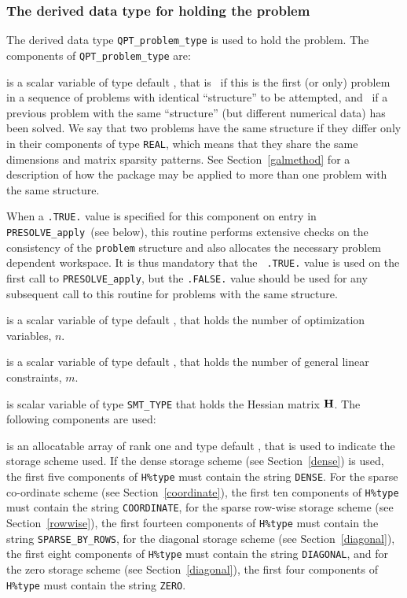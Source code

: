 \documentclass{galahad}
\newcommand{\packagename}{PRESOLVE}
\begin{document}

\subsubsection{The derived data type for holding the problem}\label{typeprob}
The derived data type {\tt QPT\_problem\_type} is used to hold
the problem. The components of {\tt QPT\_problem\_type}
are:

\begin{description}

 is a scalar variable of type default \logical,
 that is \true\ if this is the first (or only) problem in a sequence of
 problems with identical ``structure'' to be attempted, and \false\ if
 a previous problem with the same ``structure'' (but different
 numerical data) has been solved. We say that two problems have the same
 structure if they differ only in their components of type {\tt REAL}, which
 means that they share the same dimensions and matrix sparsity patterns.
 See Section~\ref{galmethod} for a description of how the package may be
 applied to  more than one problem with the same structure.

\noindent
 When a {\tt .TRUE.} value is specified for this component on entry in {\tt
 \packagename\_apply}\ (see below), this routine performs extensive checks on
 the consistency of the {\tt problem} structure and also allocates the
 necessary problem dependent workspace.  It is thus mandatory that the {\tt
 .TRUE.} value is used on the first call to {\tt \packagename\_apply}, but
 the {\tt .FALSE.} value should be used for any subsequent call to this
 routine for problems with the same structure.

 is a scalar variable of type default \integer,
 that holds the number of optimization variables, $n$.

 is a scalar variable of type default \integer,
 that holds the number of general linear constraints, $m$.

 is scalar variable of type {\tt SMT\_TYPE}
that holds the Hessian matrix ${\mathbf{H}}$. The following components
are used:

\begin{description}

 is an allocatable array of rank one and type default \character, that
is used to indicate the storage scheme used. If the dense storage scheme
(see Section~\ref{dense}) is used,
the first five components of {\tt H\%type} must contain the
string {\tt DENSE}.
For the sparse co-ordinate scheme (see Section~\ref{coordinate}),
the first ten components of {\tt H\%type} must contain the
string {\tt COORDINATE},
for the sparse row-wise storage scheme (see Section~\ref{rowwise}),
the first fourteen components of {\tt H\%type} must contain the
string {\tt SPARSE\_BY\_ROWS},
for the diagonal storage scheme (see Section~\ref{diagonal}),
the first eight components of {\tt H\%type} must contain the
string {\tt DIAGONAL},
and for the zero storage scheme (see Section~\ref{diagonal}),
the first four components of {\tt H\%type} must contain the
string {\tt ZERO}.


\end{description}
\end{description}
\end{document}
